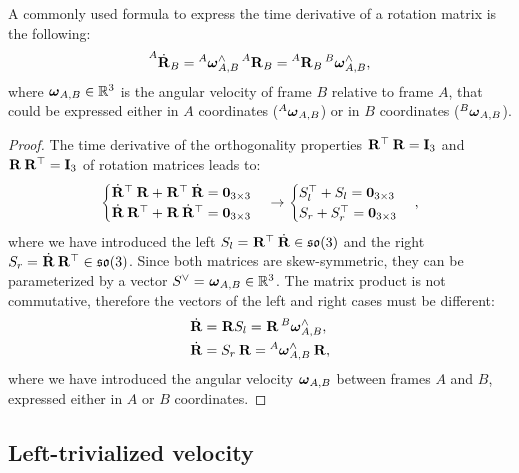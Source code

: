 \begin{definition}
\label{definition:R_dot}
%
A commonly used formula to express the time derivative of a rotation matrix is the following:
\begin{equation*}
    \rotd[A]_B = \velang[A]^\wedge_{A,B} \rot[A]_B = \rot[A]_B \velang[B]^\wedge_{A,B}
    ,
\end{equation*}
where $\velang_{A,B} \in \realn^3$ is the angular velocity of frame $B$ relative to frame $A$, that could be expressed either in $A$ coordinates ($\velang[A]_{A, B}$) or in $B$ coordinates ($\velang[B]_{A,B}$).
%
\end{definition}
%
\begin{proof}
%
The time derivative of the orthogonality properties $\rot^\top \rot = \eye_3$ and $\rot \rot^\top = \eye_3$ of rotation matrices leads to:
%
\begin{equation*}
    \begin{cases}
        \rotd^\top \rot + \rot^\top \rotd = \zeros_{3\times3} \\
        \rotd \rot^\top + \rot \rotd^\top = \zeros_{3\times3}
    \end{cases}
    \rightarrow
    \begin{cases}
        S_l^\top + S_l = \zeros_{3\times3} \\
        S_r + S_r^\top = \zeros_{3\times3}
    \end{cases}
    ,
\end{equation*}
%
where we have introduced the left $S_l = \rot^\top \rotd \in \so(3)$ and the right\linebreak $S_r = \rotd \rot^\top \in \so(3)$.
Since both matrices are skew-symmetric, they can be parameterized by a vector $S^\vee = \velang_{A,B} \in \realn^3$.
The matrix product is not commutative, therefore the vectors of the left and right cases must be different:
%
\begin{align}
\begin{split}
    \label{eq:R_dot}
    \rotd &= \rot S_l = \rot \velang[B]_{A,B}^\wedge ,\\
    \rotd &= S_r \rot = \velang[A]_{A,B}^\wedge \rot
    ,
\end{split}
\end{align}
%
where we have introduced the angular velocity $\velang_{A,B}$ between frames $A$ and $B$, expressed either in $A$ or $B$ coordinates.
%
\end{proof}

\subsection{Left-trivialized velocity}

